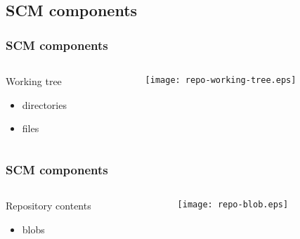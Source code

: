 \documentclass[english]{beamer}
\newcommand{\mysubsection}[2]{
  \hypertarget{#2}{}
  \subsection{#1}
  \label{#2}
}
\begin{document}
\mysubsection{SCM components}{_scm_components}

\begin{frame}
\frametitle{SCM components}
\begin{columns}[t]
        \begin{column}{.5\textwidth}
                Working tree
                \begin{itemize}
                        \item directories
                        \item files
                \end{itemize}

        \end{column}
        \begin{column}[T]{.5\textwidth}
                \vspace{.2\textheight}
                \texttt{[image: repo-working-tree.eps]}
        \end{column}
\end{columns}

\end{frame}

\begin{frame}
\frametitle{SCM components}
\begin{columns}[t]
        \begin{column}{.5\textwidth}
                Repository contents
                \begin{itemize}
                        \item blobs
                \end{itemize}
        \end{column}
        \begin{column}[T]{.5\textwidth}
                \vspace{.2\textheight}
                \texttt{[image: repo-blob.eps]}
        \end{column}
\end{columns}

\end{frame}
\end{document}
